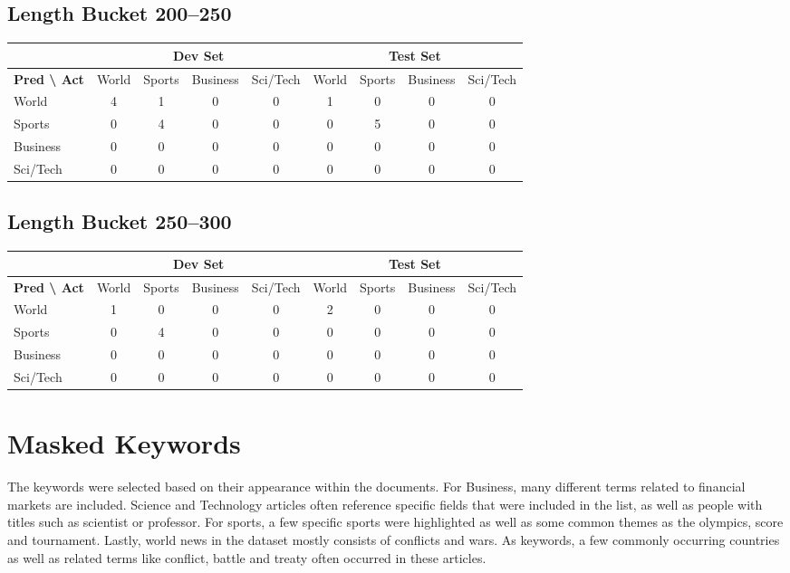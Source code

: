\documentclass[12pt,a4paper,english]{article}
\begin{document}
\subsection{Length Bucket 200--250}
\begin{tabular}{|l|cccc|cccc|}
\hline
 & \multicolumn{4}{c|}{Dev Set} & \multicolumn{4}{c|}{Test Set} \\ \hline
\textbf{Pred \textbackslash{} Act} & World & Sports & Business & Sci/Tech & World & Sports & Business & Sci/Tech \\ \hline
World    & 4 & 1 & 0 & 0 & 1 & 0 & 0 & 0 \\
Sports   & 0 & 4 & 0 & 0 & 0 & 5 & 0 & 0 \\
Business & 0 & 0 & 0 & 0 & 0 & 0 & 0 & 0 \\
Sci/Tech & 0 & 0 & 0 & 0 & 0 & 0 & 0 & 0 \\ \hline
\end{tabular}

\subsection{Length Bucket 250--300}
\begin{tabular}{|l|cccc|cccc|}
\hline
 & \multicolumn{4}{c|}{Dev Set} & \multicolumn{4}{c|}{Test Set} \\ \hline
\textbf{Pred \textbackslash{} Act} & World & Sports & Business & Sci/Tech & World & Sports & Business & Sci/Tech \\ \hline
World    & 1 & 0 & 0 & 0 & 2 & 0 & 0 & 0 \\
Sports   & 0 & 4 & 0 & 0 & 0 & 0 & 0 & 0 \\
Business & 0 & 0 & 0 & 0 & 0 & 0 & 0 & 0 \\
Sci/Tech & 0 & 0 & 0 & 0 & 0 & 0 & 0 & 0 \\ \hline
\end{tabular}

\section{Masked Keywords}
\label{ap:keywords}
The keywords were selected based on their appearance within the documents. For Business, many different terms related to financial markets are included. Science and Technology articles often reference specific fields that were included in the list, as well as people with titles such as scientist or professor. For sports, a few specific sports were highlighted as well as some common themes as the olympics, score and tournament. Lastly, world news in the dataset mostly consists of conflicts and wars. As keywords, a few commonly occurring countries as well as related terms like conflict, battle and treaty often occurred in these articles. 
\end{document}
